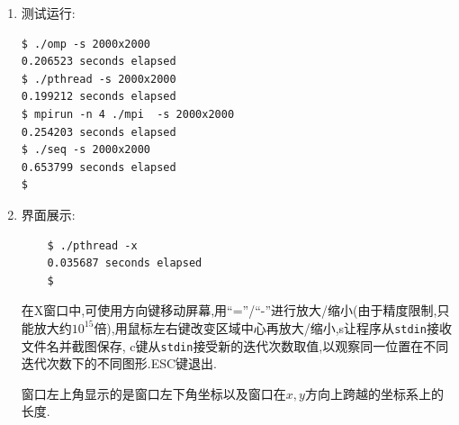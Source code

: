 \begin{enumerate}
\item 测试运行:
\begin{lstlisting}
$ ./omp -s 2000x2000
0.206523 seconds elapsed
$ ./pthread -s 2000x2000
0.199212 seconds elapsed
$ mpirun -n 4 ./mpi  -s 2000x2000
0.254203 seconds elapsed
$ ./seq -s 2000x2000
0.653799 seconds elapsed
$
\end{lstlisting}

\item 界面展示:
	\begin{lstlisting}
	$ ./pthread -x
	0.035687 seconds elapsed
	$
	\end{lstlisting}
	在X窗口中,可使用方向键移动屏幕,用``=''/``-''进行放大/缩小(由于精度限制,只能放大约$ 10^{15}$倍),用鼠标左右键改变区域中心再放大/缩小,s让程序从\verb|stdin|接收文件名并截图保存,
	c键从\verb|stdin|接受新的迭代次数取值,以观察同一位置在不同迭代次数下的不同图形.ESC键退出.

	窗口左上角显示的是窗口左下角坐标以及窗口在$ x,y$方向上跨越的坐标系上的长度.


\end{enumerate}
